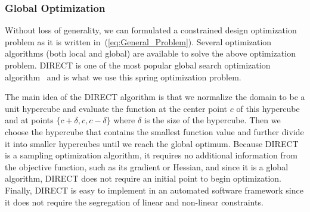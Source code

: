 \documentclass[10pt]{article}
\begin{document}
\subsubsection{Global Optimization} Without loss of generality, we can formulated a constrained design optimization problem as it is written in~(\ref{eq:General_Problem}). Several optimization algorithms (both local and global) are available to solve the above optimization problem. DIRECT is one of the most popular global search optimization algorithm~\cite{DirectUserGuide,DirectPaper} and is what we use this spring optimization problem.

The main idea of the DIRECT algorithm is that we normalize the domain to be a unit hypercube and evaluate the function at the center point $c$ of this hypercube and at points $\{c + \delta, c, c - \delta\}$ where $\delta$ is the size of the hypercube. Then we choose the hypercube that contains the smallest function value and further divide it into smaller hypercubes until we reach the global optimum. Because DIRECT is a sampling optimization algorithm, it requires no additional information from the objective function, such as its gradient or Hessian, and since it is a global algorithm, DIRECT does not require an initial point to begin optimization. Finally, DIRECT is easy to implement in an automated software framework since it does not require the segregation of linear and non-linear constraints.
\end{document}
